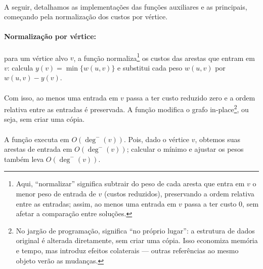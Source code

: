 \documentclass[12pt,a4paper]{article}
\def\emph#1{#1}%
\begin{document}
\paragraph{}
A seguir, detalhamos as implementações das funções auxiliares e as principais, começando pela normalização dos custos por vértice.

\paragraph{Normalização por vértice:}
para um vértice alvo $v$, a função normaliza\footnote{Aqui, “normalizar” significa subtrair do peso de cada aresta que entra em $v$ o menor peso de entrada de $v$ (custos reduzidos), preservando a ordem relativa entre as entradas; assim, ao menos uma entrada em $v$ passa a ter custo 0, sem afetar a comparação entre soluções.} os custos das arestas que \emph{entram} em $v$: calcula $y(v)=\min\{w(u,v)\}$ e 
substitui cada peso $w(u,v)$ por $w(u,v)-y(v)$. 

\paragraph{}
Com isso, ao menos uma entrada em $v$ passa a ter custo reduzido zero e a ordem relativa entre as entradas é preservada. A função modifica o grafo \emph{in-place}\footnote{No jargão de programação, significa “no próprio lugar”: a estrutura de dados original é alterada diretamente, sem criar uma cópia. Isso economiza memória e tempo, mas introduz efeitos colaterais — outras referências ao mesmo objeto verão as mudanças.}, ou seja, sem criar uma cópia. 

\paragraph{}
A função executa em $O(\deg^-(v))$. Pois, dado o vértice $v$, obtemos suas arestas de entrada em $O(\deg^-(v))$; calcular o mínimo e ajustar os pesos também leva $O(\deg^-(v))$.
\end{document}

